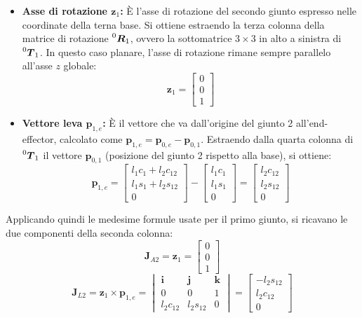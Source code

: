 \documentclass[11pt, a4paper]{report}
\begin{document}
\begin{itemize}
    \item \textbf{Asse di rotazione \(\bm{z}_1\):} È l'asse di rotazione del secondo giunto espresso nelle coordinate della terna base. Si ottiene estraendo la terza colonna della matrice di rotazione \(\prescript{0}{}{\bm{R}}_1\), ovvero la sottomatrice \(3 \times 3\) in alto a sinistra di \(\prescript{0}{}{\bm{T}}_1\). In questo caso planare, l'asse di rotazione rimane sempre parallelo all'asse \(z\) globale:
    \[ \bm{z}_1 = \begin{bmatrix} 0 \\ 0 \\ 1 \end{bmatrix} \]
    \item \textbf{Vettore leva \(\bm{p}_{1,e}\):} È il vettore che va dall'origine del giunto 2 all'end-effector, calcolato come \(\bm{p}_{1,e} = \bm{p}_{0,e} - \bm{p}_{0,1}\). Estraendo dalla quarta colonna di \(\prescript{0}{}{\bm{T}}_1\) il vettore \(\bm{p}_{0,1}\) (posizione del giunto 2 rispetto alla base), si ottiene:
    \[
        \bm{p}_{1,e} =
        \begin{bmatrix} l_1 c_1 + l_2 c_{12} \\ l_1 s_1 + l_2 s_{12} \\ 0 \end{bmatrix}
        -
        \begin{bmatrix} l_1 c_1 \\ l_1 s_1 \\ 0 \end{bmatrix}
        =
        \begin{bmatrix} l_2 c_{12} \\ l_2 s_{12} \\ 0 \end{bmatrix}
    \]
\end{itemize}
Applicando quindi le medesime formule usate per il primo giunto, si ricavano le due componenti della seconda colonna:
\[
    \bm{J}_{A2} = \bm{z}_1 = \begin{bmatrix} 0 \\ 0 \\ 1 \end{bmatrix}
\]
\[
    \bm{J}_{L2} = \bm{z}_1 \times \bm{p}_{1,e} =
    \begin{vmatrix}
        \bm{i} & \bm{j} & \bm{k} \\
        0 & 0 & 1 \\
        l_2 c_{12} & l_2 s_{12} & 0
    \end{vmatrix}
    = \begin{bmatrix} -l_2 s_{12} \\ l_2 c_{12} \\ 0 \end{bmatrix}
\]
\end{document}
